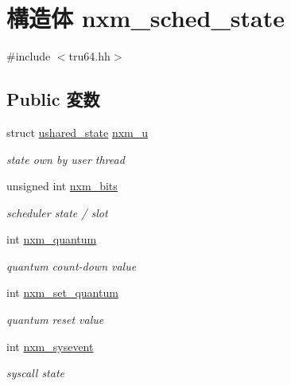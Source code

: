 \hypertarget{structTru64_1_1nxm__sched__state}{
\section{構造体 nxm\_\-sched\_\-state}
\label{structTru64_1_1nxm__sched__state}
}


{\ttfamily \#include $<$tru64.hh$>$}\subsection*{Public 変数}
\begin{DoxyCompactItemize}
\item 
struct \hyperlink{structTru64_1_1ushared__state}{ushared\_\-state} \hyperlink{structTru64_1_1nxm__sched__state_abff28b82019b9db3f64738a3048d0a46}{nxm\_\-u}
\begin{DoxyCompactList}\small\item\em state own by user thread \item\end{DoxyCompactList}\item 
unsigned int \hyperlink{structTru64_1_1nxm__sched__state_aebeca6fcbee8c6e89bdb8f64f661eda1}{nxm\_\-bits}
\begin{DoxyCompactList}\small\item\em scheduler state / slot \item\end{DoxyCompactList}\item 
int \hyperlink{structTru64_1_1nxm__sched__state_a1edf25e35f3eb9bddad20dec442db246}{nxm\_\-quantum}
\begin{DoxyCompactList}\small\item\em quantum count-\/down value \item\end{DoxyCompactList}\item 
int \hyperlink{structTru64_1_1nxm__sched__state_a9291f98fb828769c72a7342ac8b1432a}{nxm\_\-set\_\-quantum}
\begin{DoxyCompactList}\small\item\em quantum reset value \item\end{DoxyCompactList}\item 
int \hyperlink{structTru64_1_1nxm__sched__state_aa46cf99f11765db5dcd6ea3d6f276d02}{nxm\_\-sysevent}
\begin{DoxyCompactList}\small\item\em syscall state \item\end{DoxyCompactList}\item 

\end{DoxyCompactItemize}
